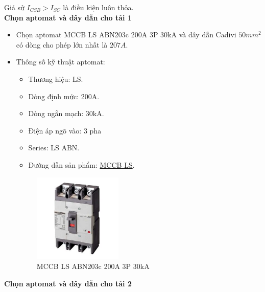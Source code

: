            Giả sử $I_{CSB} > I_{SC}$ là điều kiện luôn thỏa. \\[0.2cm]
            \textbf{Chọn aptomat và dây dẫn cho tải 1}
                \begin{itemize}
                    \item Chọn aptomat MCCB LS ABN203c 200A 3P 30kA và dây dẫn Cadivi $50mm^2$ có dòng cho phép lớn nhất là $207A$.
                    \item Thông số kỹ thuật aptomat:
                        \begin{itemize}
                            \item Thương hiệu: LS.
                            \item Dòng định mức: 200A.
                            \item Dòng ngắn mạch: 30kA.
                            \item Điện áp ngõ vào: 3 pha
                            \item Series: LS ABN.
                            \item Đường dẫn sản phẩm: \href{https://codienhaiau.com/product/mccb-ls-abn203c-200a-30ka-3p/}{MCCB LS}.
                        \end{itemize}
                        \begin{figure}[H]
                            \centering
                            \includegraphics[width=0.4\textwidth]{pictures/2l.png}
                            \caption{MCCB LS ABN203c 200A 3P 30kA}
                        \end{figure}
                \end{itemize}
            \textbf{Chọn aptomat và dây dẫn cho tải 2}
